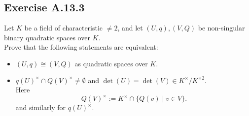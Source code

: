 \documentclass[12pt, a4paper]{article}
\begin{document}
\subsection*{Exercise A.13.3}
Let $K$ be a field of characteristic $\neq 2$, and let $(U, q), (V, Q)$ be non-singular binary quadratic spaces over $K$. \\
Prove that the following statements are equivalent:
\begin{itemize}
    \item[(i)] $(U, q) \cong (V, Q)$ as quadratic spaces over $K$.
    \item[(ii)] $q(U)^\times \cap Q(V)^\times \neq \emptyset$ and $\det(U) = \det(V) \in K^\times / K^{\times 2}$. \\
    Here 
    \[ Q(V)^\times := K^\times \cap \{ Q(v) \mid v \in V \}. \]
    and similarly for $q(U)^\times$.
\end{itemize}
\end{document}
